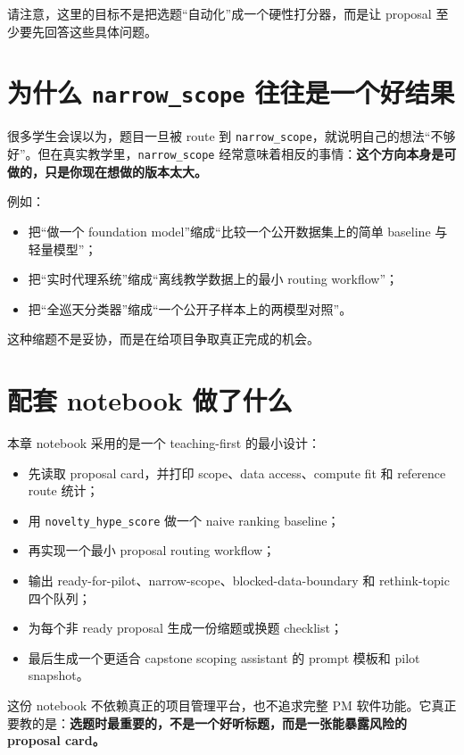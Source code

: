 请注意，这里的目标不是把选题“自动化”成一个硬性打分器，而是让 proposal 至少要先回答这些具体问题。

\section{为什么 \texttt{narrow\_scope} 往往是一个好结果}

很多学生会误以为，题目一旦被 route 到 \texttt{narrow\_scope}，就说明自己的想法“不够好”。但在真实教学里，\texttt{narrow\_scope} 经常意味着相反的事情：\textbf{这个方向本身是可做的，只是你现在想做的版本太大。}

例如：

\begin{itemize}
    \item 把“做一个 foundation model”缩成“比较一个公开数据集上的简单 baseline 与轻量模型”；
    \item 把“实时代理系统”缩成“离线教学数据上的最小 routing workflow”；
    \item 把“全巡天分类器”缩成“一个公开子样本上的两模型对照”。
\end{itemize}

这种缩题不是妥协，而是在给项目争取真正完成的机会。

\section{配套 notebook 做了什么}

本章 notebook 采用的是一个 teaching-first 的最小设计：

\begin{itemize}
    \item 先读取 proposal card，并打印 scope、data access、compute fit 和 reference route 统计；
    \item 用 \texttt{novelty\_hype\_score} 做一个 naive ranking baseline；
    \item 再实现一个最小 proposal routing workflow；
    \item 输出 ready-for-pilot、narrow-scope、blocked-data-boundary 和 rethink-topic 四个队列；
    \item 为每个非 ready proposal 生成一份缩题或换题 checklist；
    \item 最后生成一个更适合 capstone scoping assistant 的 prompt 模板和 pilot snapshot。
\end{itemize}

这份 notebook 不依赖真正的项目管理平台，也不追求完整 PM 软件功能。它真正要教的是：\textbf{选题时最重要的，不是一个好听标题，而是一张能暴露风险的 proposal card。}

